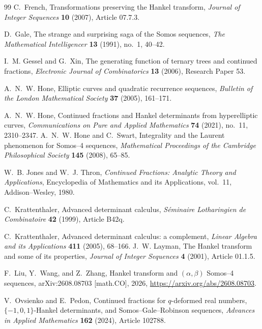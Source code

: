\documentclass[11pt]{article}
\theoremstyle{remark}
\begin{document}
\begin{thebibliography}{99}
C.~French,
\newblock Transformations preserving the Hankel transform,
\newblock \emph{Journal of Integer Sequences} \textbf{10} (2007), Article 07.7.3.

D.~Gale,
\newblock The strange and surprising saga of the Somos sequences,
\newblock \emph{The Mathematical Intelligencer} \textbf{13} (1991), no.~1, 40--42.

I.~M. Gessel and G.~Xin,
\newblock The generating function of ternary trees and continued fractions,
\newblock \emph{Electronic Journal of Combinatorics} \textbf{13} (2006), Research Paper 53.

A.~N.~W. Hone,
\newblock Elliptic curves and quadratic recurrence sequences,
\newblock \emph{Bulletin of the London Mathematical Society} \textbf{37} (2005), 161--171.

A.~N.~W. Hone,
\newblock Continued fractions and Hankel determinants from hyperelliptic curves,
\newblock \emph{Communications on Pure and Applied Mathematics} \textbf{74} (2021), no.~11, 2310--2347.
A.~N.~W. Hone and C.~Swart,
\newblock Integrality and the Laurent phenomenon for Somos--4 sequences,
\newblock \emph{Mathematical Proceedings of the Cambridge Philosophical Society}
\textbf{145} (2008), 65--85.

W.~B. Jones and W.~J. Thron,
\newblock \emph{Continued Fractions: Analytic Theory and Applications},
\newblock Encyclopedia of Mathematics and its Applications, vol.~11,
Addison--Wesley, 1980.

C.~Krattenthaler,
\newblock Advanced determinant calculus,
\newblock \emph{S\'eminaire Lotharingien de Combinatoire} \textbf{42} (1999), Article B42q.

C.~Krattenthaler,
\newblock Advanced determinant calculus: a complement,
\newblock \emph{Linear Algebra and its Applications} \textbf{411} (2005), 68--166.
J.~W. Layman,
\newblock The Hankel transform and some of its properties,
\newblock \emph{Journal of Integer Sequences} \textbf{4} (2001), Article 01.1.5.

F.~Liu, Y.~Wang, and Z.~Zhang,
\newblock Hankel transform and $(\alpha,\beta)$ Somos--4 sequences,
\newblock arXiv:2608.08703 [math.CO], 2026,
\newblock \url{https://arxiv.org/abs/2608.08703}.

V.~Ovsienko and E.~Pedon,
\newblock Continued fractions for $q$-deformed real numbers,
$\{-1,0,1\}$-Hankel determinants, and Somos--Gale--Robinson sequences,
\newblock \emph{Advances in Applied Mathematics} \textbf{162} (2024), Article 102788.


\end{thebibliography}
\end{document}
